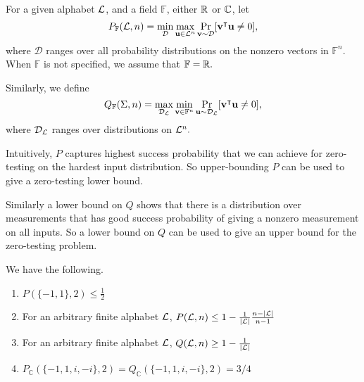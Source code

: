 \begin{definition}
For a given alphabet ${\mathcal L}$, and a field $\mathbb{F}$, either $\mathbb{R}$ or $\mathbb{C}$, let 
\[
P_{\mathbb{F}}({\mathcal L}, n) = \min_{\mathcal{D}} \max_{\boldsymbol{\mathrm{u}} \in {\mathcal L}^n} \Pr_{\boldsymbol{\mathrm{v}} \sim \mathcal{D}}[\boldsymbol{\mathrm{v}}^\intercal \boldsymbol{\mathrm{u}} \neq 0],
\]
where $\mathcal{D}$ ranges over all probability distributions on the nonzero vectors in $\mathbb{F}^n.$ When $\mathbb{F}$ is not specified, we assume that $\mathbb{F} = \mathbb{R}.$

Similarly, we define
\[
Q_{\mathbb{F}}(\Sigma, n) = \max_{\mathcal{D}_{{\mathcal L}}} \min_{\boldsymbol{\mathrm{v}} \in \mathbb{F}^n} \Pr_{\boldsymbol{\mathrm{u}} \sim \mathcal{D}_{{\mathcal L}}}[\boldsymbol{\mathrm{v}}^\intercal \boldsymbol{\mathrm{u}} \neq 0],
\]
where $\mathcal{D}_{{\mathcal L}}$ ranges over distributions on ${\mathcal L}^n.$
\end{definition}

Intuitively, $P$ captures highest success probability that we can achieve for zero-testing on the hardest input distribution.  So upper-bounding $P$ can be used to give a zero-testing lower bound.

Similarly a lower bound on $Q$ shows that there is a distribution over measurements that has good success probability of giving a nonzero measurement on all inputs.  So a lower bound on $Q$ can be used to give an upper bound for the zero-testing problem.


\begin{theorem}
\label{thm:alphabet_lower_bounds}
We have the following.
\begin{enumerate}
\item $P(\{-1,1\}, 2) \leq \frac12$
\item For an arbitrary finite alphabet ${\mathcal L}$, $P({\mathcal L}, n) \leq 1 - \frac{1}{{\vert{\ensuremath{{\mathcal L}}}\vert}}\frac{n-{\vert{\ensuremath{{\mathcal L}}}\vert}}{n-1}$
\item For an arbitrary finite alphabet ${\mathcal L}$, $Q({\mathcal L}, n) \geq 1 - \frac{1}{\vert{\ensuremath{{\mathcal L}}}\vert}$


\item $P_{\mathbb{C}}(\{-1,1,i,-i\}, 2) = Q_{\mathbb{C}}(\{-1,1,i,-i\}, 2) = 3/4$

\end{enumerate}

\end{theorem}


